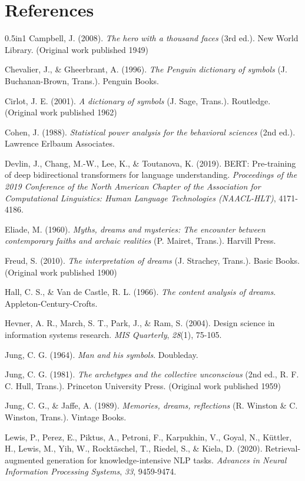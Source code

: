 \documentclass[12pt,a4paper]{report}
\begin{document}
\chapter*{References}
\begin{hangparas}{0.5in}{1}
Campbell, J. (2008). \textit{The hero with a thousand faces} (3rd ed.). New World Library. (Original work published 1949)\par
Chevalier, J., \& Gheerbrant, A. (1996). \textit{The Penguin dictionary of symbols} (J. Buchanan-Brown, Trans.). Penguin Books.\par
Cirlot, J. E. (2001). \textit{A dictionary of symbols} (J. Sage, Trans.). Routledge. (Original work published 1962)\par
Cohen, J. (1988). \textit{Statistical power analysis for the behavioral sciences} (2nd ed.). Lawrence Erlbaum Associates.\par
Devlin, J., Chang, M.-W., Lee, K., \& Toutanova, K. (2019). BERT: Pre-training of deep bidirectional transformers for language understanding. \textit{Proceedings of the 2019 Conference of the North American Chapter of the Association for Computational Linguistics: Human Language Technologies (NAACL-HLT)}, 4171-4186.\par
Eliade, M. (1960). \textit{Myths, dreams and mysteries: The encounter between contemporary faiths and archaic realities} (P. Mairet, Trans.). Harvill Press.\par
Freud, S. (2010). \textit{The interpretation of dreams} (J. Strachey, Trans.). Basic Books. (Original work published 1900)\par
Hall, C. S., \& Van de Castle, R. L. (1966). \textit{The content analysis of dreams}. Appleton-Century-Crofts.\par
Hevner, A. R., March, S. T., Park, J., \& Ram, S. (2004). Design science in information systems research. \textit{MIS Quarterly}, \textit{28}(1), 75-105.\par
Jung, C. G. (1964). \textit{Man and his symbols}. Doubleday.\par
Jung, C. G. (1981). \textit{The archetypes and the collective unconscious} (2nd ed., R. F. C. Hull, Trans.). Princeton University Press. (Original work published 1959)\par
Jung, C. G., \& Jaffe, A. (1989). \textit{Memories, dreams, reflections} (R. Winston \& C. Winston, Trans.). Vintage Books.\par
Lewis, P., Perez, E., Piktus, A., Petroni, F., Karpukhin, V., Goyal, N., Küttler, H., Lewis, M., Yih, W., Rocktäschel, T., Riedel, S., \& Kiela, D. (2020). Retrieval-augmented generation for knowledge-intensive NLP tasks. \textit{Advances in Neural Information Processing Systems}, \textit{33}, 9459-9474.\par

\end{hangparas}
\end{document}
